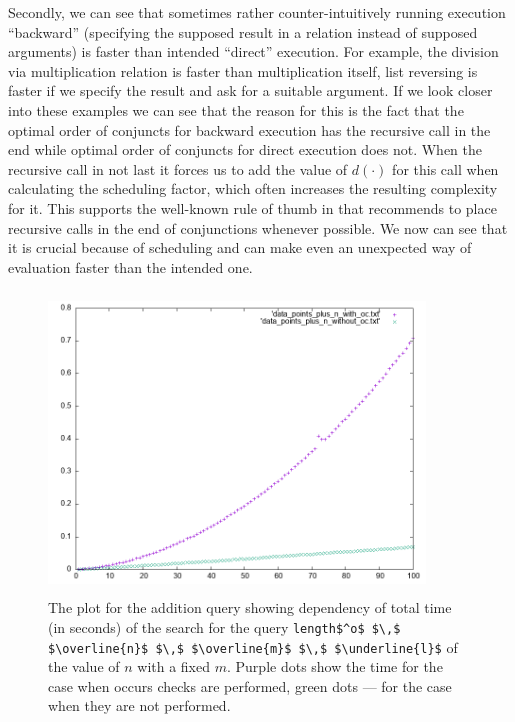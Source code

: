 Secondly, we can see that sometimes rather counter-intuitively running execution ``backward'' (specifying the supposed result in a relation instead of supposed arguments) is faster than intended ``direct'' execution. For example, the division via multiplication relation is faster than multiplication itself, list reversing is faster if we specify the result and ask for a suitable argument. If we look closer into these examples we can see that the reason for this is the fact that the optimal order of conjuncts for backward execution has the recursive call in the end while optimal order of conjuncts for direct execution does not. When the recursive call in not last it forces us to add the value of $d(\cdot)$ for this call when calculating the scheduling factor, which often increases the resulting complexity for it. This supports the well-known rule of thumb in \mK that recommends to place recursive calls in the end of conjunctions whenever possible. We now can see that it is crucial because of scheduling and can make even an unexpected way of evaluation faster than the intended one.

\begin{figure}[t]
    \includegraphics[width=10cm,height=8cm]{plot_example}
  \caption{The plot for the addition query showing dependency of total time (in seconds) of the search for the query \lstinline|length$^o$ $\,$ $\overline{n}$ $\,$ $\overline{m}$ $\,$ $\underline{l}$| of the value of $n$ with a fixed $m$. Purple dots show the time for the case when occurs checks are performed, green dots --- for the case when they are not performed. }
  \label{fig:plot_example}
\end{figure}


